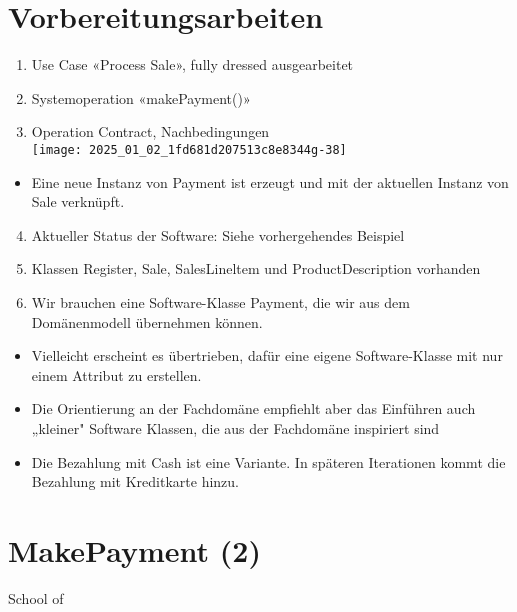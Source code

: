 \documentclass[10pt]{article}
\begin{document}
\section*{Vorbereitungsarbeiten}
\begin{enumerate}
  \item Use Case «Process Sale», fully dressed ausgearbeitet
  \item Systemoperation «makePayment()»
  \item Operation Contract, Nachbedingungen\\
\texttt{[image: 2025\_01\_02\_1fd681d207513c8e8344g-38]}
\end{enumerate}

\begin{itemize}
  \item Eine neue Instanz von Payment ist erzeugt und mit der aktuellen Instanz von Sale verknüpft.
\end{itemize}

\begin{enumerate}
  \setcounter{enumi}{3}
  \item Aktueller Status der Software: Siehe vorhergehendes Beispiel
  \item Klassen Register, Sale, SalesLineltem und ProductDescription vorhanden
  \item Wir brauchen eine Software-Klasse Payment, die wir aus dem Domänenmodell übernehmen können.
\end{enumerate}

\begin{itemize}
  \item Vielleicht erscheint es übertrieben, dafür eine eigene Software-Klasse mit nur einem Attribut zu erstellen.
  \item Die Orientierung an der Fachdomäne empfiehlt aber das Einführen auch „kleiner" Software Klassen, die aus der Fachdomäne inspiriert sind
  \item Die Bezahlung mit Cash ist eine Variante. In späteren Iterationen kommt die Bezahlung mit Kreditkarte hinzu.
\end{itemize}

\section*{MakePayment (2)}
School of
\end{document}

